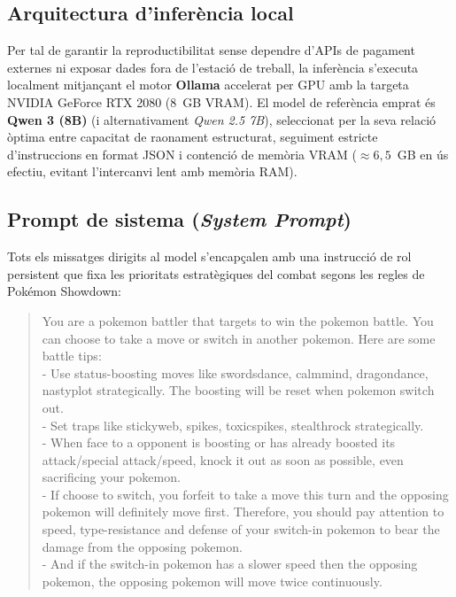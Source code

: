 \subsection{Arquitectura d'inferència local}

Per tal de garantir la reproductibilitat sense dependre d'APIs de pagament externes ni exposar dades fora de l'estació de treball, la inferència s'executa localment mitjançant el motor \textbf{Ollama} accelerat per GPU amb la targeta NVIDIA GeForce RTX 2080 (8~GB VRAM). El model de referència emprat és \textbf{Qwen 3 (8B)} (i alternativament \textit{Qwen 2.5 7B}), seleccionat per la seva relació òptima entre capacitat de raonament estructurat, seguiment estricte d'instruccions en format JSON i contenció de memòria VRAM ($\approx 6{,}5$~GB en ús efectiu, evitant l'intercanvi lent amb memòria RAM).

\subsection{Prompt de sistema (\emph{System Prompt})}

Tots els missatges dirigits al model s'encapçalen amb una instrucció de rol persistent que fixa les prioritats estratègiques del combat segons les regles de Pokémon Showdown:

\begin{quote}
\small\ttfamily\raggedright
You are a pokemon battler that targets to win the pokemon battle. You can choose to take a move or switch in another pokemon. Here are some battle tips: \\
- Use status-boosting moves like swordsdance, calmmind, dragondance, nastyplot strategically. The boosting will be reset when pokemon switch out. \\
- Set traps like stickyweb, spikes, toxicspikes, stealthrock strategically. \\
- When face to a opponent is boosting or has already boosted its attack/special attack/speed, knock it out as soon as possible, even sacrificing your pokemon. \\
- If choose to switch, you forfeit to take a move this turn and the opposing pokemon will definitely move first. Therefore, you should pay attention to speed, type-resistance and defense of your switch-in pokemon to bear the damage from the opposing pokemon. \\
- And if the switch-in pokemon has a slower speed then the opposing pokemon, the opposing pokemon will move twice continuously.
\end{quote}

